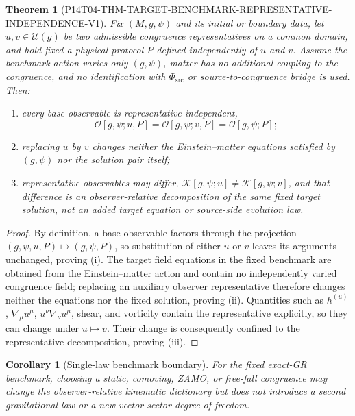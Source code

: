 \documentclass[11pt]{article}
\newtheorem{theorem}{Theorem}
\newtheorem{corollary}{Corollary}
\newcommand{\PhiSrc}{\Phi_{\mathrm{src}}}
\begin{document}
\begin{theorem}[P14T04-THM-TARGET-BENCHMARK-REPRESENTATIVE-INDEPENDENCE-V1]
Fix $(M,g,\psi)$ and its initial or boundary data, let
$u,v\in\mathcal U(g)$ be two admissible congruence representatives on a
common domain, and hold fixed a physical protocol $P$ defined independently
of $u$ and $v$.  Assume the benchmark action varies only $(g,\psi)$, matter
has no additional coupling to the congruence, and no identification with
$\PhiSrc$ or source-to-congruence bridge is used.  Then:
\begin{enumerate}[label=(\roman*)]
  \item every base observable is representative independent,
  \[
     \mathcal O[g,\psi;u,P]=\mathcal O[g,\psi;v,P]
     =\mathcal O[g,\psi;P];
  \]
  \item replacing $u$ by $v$ changes neither the Einstein--matter equations
  satisfied by $(g,\psi)$ nor the solution pair itself;
  \item representative observables may differ,
  $\mathcal K[g,\psi;u]\neq\mathcal K[g,\psi;v]$, and that difference is an
  observer-relative decomposition of the same fixed target solution, not an
  added target equation or source-side evolution law.
\end{enumerate}
\end{theorem}

\begin{proof}
By definition, a base observable factors through the projection
$(g,\psi,u,P)\mapsto(g,\psi,P)$, so substitution of either $u$ or $v$ leaves
its arguments unchanged, proving (i).  The target field equations in the
fixed benchmark are obtained from the Einstein--matter action and contain no
independently varied congruence field; replacing an auxiliary observer
representative therefore changes neither the equations nor the fixed
solution, proving (ii).  Quantities such as
$h^{(u)}$, $\nabla_\mu u^\mu$, $u^\nu\nabla_\nu u^\mu$, shear, and vorticity
contain the representative explicitly, so they can change under
$u\mapsto v$.  Their change is consequently confined to the representative
decomposition, proving (iii).
\end{proof}

\begin{corollary}[Single-law benchmark boundary]
For the fixed exact-GR benchmark, choosing a static, comoving, ZAMO, or
free-fall congruence may change the observer-relative kinematic dictionary but
does not introduce a second gravitational law or a new vector-sector degree
of freedom.
\end{corollary}
\end{document}
